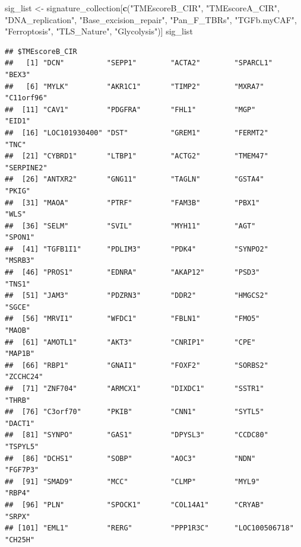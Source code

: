 \documentclass[
  12pt,
]{book}
\newenvironment{Shaded}{\begin{snugshade}}{\end{snugshade}}
\newcommand{\FunctionTok}[1]{\textcolor[rgb]{0.13,0.29,0.53}{\textbf{#1}}}
\newcommand{\NormalTok}[1]{#1}
\newcommand{\OtherTok}[1]{\textcolor[rgb]{0.56,0.35,0.01}{#1}}
\newcommand{\StringTok}[1]{\textcolor[rgb]{0.31,0.60,0.02}{#1}}
\theoremstyle{definition}
\theoremstyle{definition}
\theoremstyle{definition}
\theoremstyle{definition}
\theoremstyle{remark}
\begin{document}
\begin{Shaded}
\begin{Highlighting}[]
\NormalTok{sig\_list }\OtherTok{\textless{}{-}}\NormalTok{ signature\_collection[}\FunctionTok{c}\NormalTok{(}\StringTok{"TMEscoreB\_CIR"}\NormalTok{, }\StringTok{"TMEscoreA\_CIR"}\NormalTok{, }\StringTok{"DNA\_replication"}\NormalTok{, }\StringTok{"Base\_excision\_repair"}\NormalTok{,}
                                   \StringTok{"Pan\_F\_TBRs"}\NormalTok{, }\StringTok{"TGFb.myCAF"}\NormalTok{, }\StringTok{"Ferroptosis"}\NormalTok{, }\StringTok{"TLS\_Nature"}\NormalTok{, }\StringTok{"Glycolysis"}\NormalTok{)]}
\NormalTok{sig\_list}
\end{Highlighting}
\end{Shaded}

\begin{verbatim}
## $TMEscoreB_CIR
##   [1] "DCN"          "SEPP1"        "ACTA2"        "SPARCL1"      "BEX3"        
##   [6] "MYLK"         "AKR1C1"       "TIMP2"        "MXRA7"        "C11orf96"    
##  [11] "CAV1"         "PDGFRA"       "FHL1"         "MGP"          "EID1"        
##  [16] "LOC101930400" "DST"          "GREM1"        "FERMT2"       "TNC"         
##  [21] "CYBRD1"       "LTBP1"        "ACTG2"        "TMEM47"       "SERPINE2"    
##  [26] "ANTXR2"       "GNG11"        "TAGLN"        "GSTA4"        "PKIG"        
##  [31] "MAOA"         "PTRF"         "FAM3B"        "PBX1"         "WLS"         
##  [36] "SELM"         "SVIL"         "MYH11"        "AGT"          "SPON1"       
##  [41] "TGFB1I1"      "PDLIM3"       "PDK4"         "SYNPO2"       "MSRB3"       
##  [46] "PROS1"        "EDNRA"        "AKAP12"       "PSD3"         "TNS1"        
##  [51] "JAM3"         "PDZRN3"       "DDR2"         "HMGCS2"       "SGCE"        
##  [56] "MRVI1"        "WFDC1"        "FBLN1"        "FMO5"         "MAOB"        
##  [61] "AMOTL1"       "AKT3"         "CNRIP1"       "CPE"          "MAP1B"       
##  [66] "RBP1"         "GNAI1"        "FOXF2"        "SORBS2"       "ZCCHC24"     
##  [71] "ZNF704"       "ARMCX1"       "DIXDC1"       "SSTR1"        "THRB"        
##  [76] "C3orf70"      "PKIB"         "CNN1"         "SYTL5"        "DACT1"       
##  [81] "SYNPO"        "GAS1"         "DPYSL3"       "CCDC80"       "TSPYL5"      
##  [86] "DCHS1"        "SOBP"         "AOC3"         "NDN"          "FGF7P3"      
##  [91] "SMAD9"        "MCC"          "CLMP"         "MYL9"         "RBP4"        
##  [96] "PLN"          "SPOCK1"       "COL14A1"      "CRYAB"        "SRPX"        
## [101] "EML1"         "RERG"         "PPP1R3C"      "LOC100506718" "CH25H"       

\end{verbatim}
\end{document}
